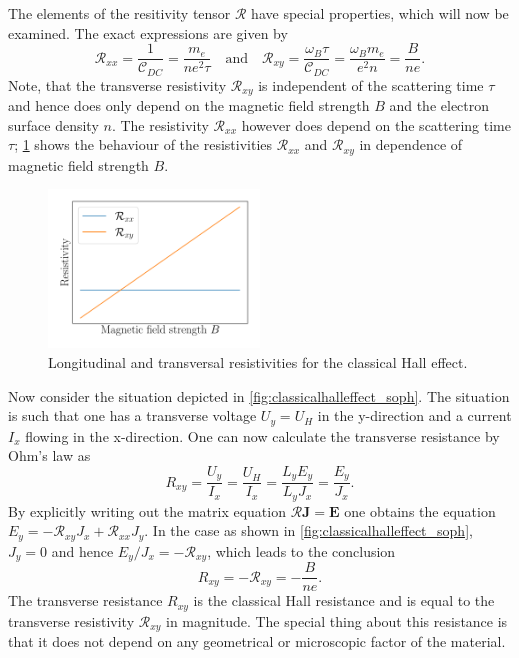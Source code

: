 \documentclass{report}
\numberwithin{tm}{section}
\newcommand\matr[1]{\ensuremath{\boldsymbol{\mathbf{#1}}}}
\newcommand\vect[1]{\ensuremath{\bm{#1}}}
\begin{document}
	The elements of the resitivity tensor $\matr{\mathcal{R}}$ have special properties, which will now be examined. The exact expressions are given by \begin{equation}\label{eq:che_resistivities}
		\mathcal{R}_{xx} = \frac{1}{\mathcal{C}_{DC}} = \frac{m_e}{ne^2\tau}\quad \text{and} \quad \mathcal{R}_{xy} = \frac{\omega_B\tau}{\mathcal{C}_{DC}} = \frac{\omega_Bm_e}{e^2n} = \frac{B}{ne}.
	\end{equation} Note, that the transverse resistivity $\mathcal{R}_{xy}$ is independent of the scattering time $\tau$ and hence does only depend on the magnetic field strength $B$ and the electron surface density $n$. The resistivity $\mathcal{R}_{xx}$ however does depend on the scattering time $\tau$; \cref{fig:classhall_resistivities} shows the behaviour of the resistivities $\mathcal{R}_{xx}$ and $\mathcal{R}_{xy}$ in dependence of magnetic field strength $B$. 
	\begin{figure}[h]
		\centering
		\includegraphics[width=0.5\textwidth]{figures/classhall_resistivities.pdf}
		\caption{Longitudinal and transversal resistivities for the classical Hall effect.}
		\label{fig:classhall_resistivities}
	\end{figure}
	Now consider the situation depicted in \cref{fig:classicalhalleffect_soph}. The situation is such that one has a transverse voltage $U_y = U_H$ in the y-direction and a current $I_x$ flowing in the x-direction. One can now calculate the transverse resistance by Ohm's law as \begin{equation}
	R_{xy} = \frac{U_y}{I_x} = \frac{U_H}{I_x} = \frac{L_yE_y}{L_yJ_x} = \frac{E_y}{J_x}.
	\end{equation} By explicitly writing out the matrix equation $\matr{\mathcal{R}}\vect{J} = \vect{E}$ one obtains the equation $E_y = -\mathcal{R}_{xy}J_x + \mathcal{R}_{xx}J_y$. In the case as shown in \cref{fig:classicalhalleffect_soph}, $J_y = 0$ and hence $E_y/J_x = -\mathcal{R}_{xy}$, which leads to the conclusion \begin{equation}
	R_{xy} = -\mathcal{R}_{xy} = -\frac{B}{ne}.
	\end{equation} The transverse resistance $R_{xy}$ is the classical Hall resistance and is equal to the transverse resistivity $\mathcal{R}_{xy}$ in magnitude. The special thing about this resistance is that it does not depend on any geometrical or microscopic factor of the material.
	
\end{document}
